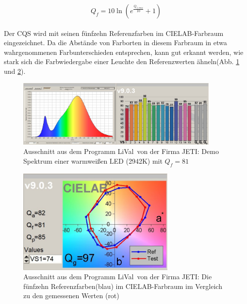 \begin{equation}\label{gl_cqs3}
		Q_{f} = 10 \ln(e^{\frac{Q_{f,rms}}{10}}+1) 
\end{equation}\\
Der CQS wird mit seinen fünfzehn Referenzfarben im CIELAB-Farbraum eingezeichnet. Da die Abstände von Farborten in diesem Farbraum in etwa wahrgenommenen Farbunterschieden entsprechen, kann gut erkannt werden, wie stark sich die Farbwiedergabe einer Leuchte den Referenzwerten ähneln(Abb. \ref{b_cqs2a} und \ref{b_cqs2b}).\\

\begin{figure}[H]     %
\centering
\includegraphics[width=0.9\textwidth]{bilder/cqs2a} 
\caption {Ausschnitt aus dem Programm \glqq LiVal\grqq\ von der Firma JETI: Demo Spektrum einer warmweißen LED (2942K) mit $Q_{f} = 81$}\label{b_cqs2a}
\end{figure}

\begin{figure}[H]     %
\centering
\includegraphics[width=0.7\textwidth]{bilder/cqs2b} 
\caption {Ausschnitt aus dem Programm \glqq LiVal\grqq\ von der Firma JETI: Die fünfzehn Referenzfarben(blau) im CIELAB-Farbraum im Vergleich zu den gemessenen Werten (rot)}\label{b_cqs2b}
\end{figure}

